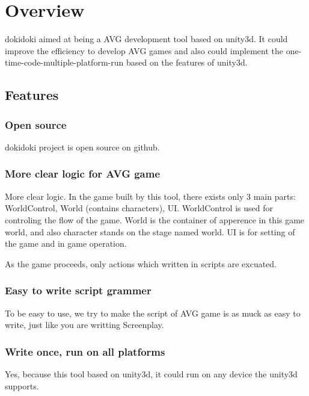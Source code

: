 \chapter{Overview}

dokidoki aimed at being a AVG development tool based on unity3d. It could improve the efficiency to develop AVG games and also could implement the one-time-code-multiple-platform-run based on the features of unity3d.

\section{Features}

\subsection{Open source}

dokidoki project is open source on github.

\subsection{More clear logic for AVG game}
More clear logic. In the game built by this tool, there exists only 3 main parts: WorldControl, World (contains characters), UI. WorldControl is used for controling the flow of the game. World is the container of apperence in this game world, and also character stands on the stage named world. UI is for setting of the game and in game operation.

As the game proceeds, only actions which written in scripts are excuated.

\subsection{Easy to write script grammer}

To be easy to use, we try to make the script of AVG game is as muck as easy to write, just like you are writting Screenplay.

\subsection{Write once, run on all platforms}

Yes, because this tool based on unity3d, it could run on any device the unity3d supports.